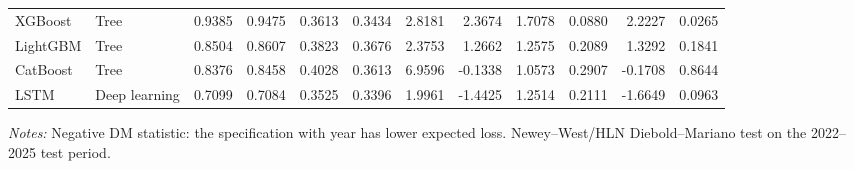 \begin{table}[htbp]
{\begin{tabular}{llrrrrrrrrrr}
XGBoost & Tree & 0.9385 & 0.9475 & 0.3613 & 0.3434 & 2.8181 & 2.3674 & 1.7078 & 0.0880 & 2.2227 & 0.0265 \\
LightGBM & Tree & 0.8504 & 0.8607 & 0.3823 & 0.3676 & 2.3753 & 1.2662 & 1.2575 & 0.2089 & 1.3292 & 0.1841 \\
CatBoost & Tree & 0.8376 & 0.8458 & 0.4028 & 0.3613 & 6.9596 & -0.1338 & 1.0573 & 0.2907 & -0.1708 & 0.8644 \\
LSTM & Deep learning & 0.7099 & 0.7084 & 0.3525 & 0.3396 & 1.9961 & -1.4425 & 1.2514 & 0.2111 & -1.6649 & 0.0963 \\
\bottomrule
\end{tabular}%
}
\par\vspace{2pt}\footnotesize\textit{Notes:} Negative DM statistic: the specification with year has lower expected loss. Newey--West/HLN Diebold--Mariano test on the 2022--2025 test period.
\end{table}

